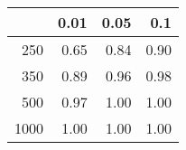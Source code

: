 % 
\begin{tabular}{rrrr}
  \hline
 & 0.01 & 0.05 & 0.1 \\ 
  \hline
250 & 0.65 & 0.84 & 0.90 \\ 
  350 & 0.89 & 0.96 & 0.98 \\ 
  500 & 0.97 & 1.00 & 1.00 \\ 
  1000 & 1.00 & 1.00 & 1.00 \\ 
   \hline
\end{tabular}
